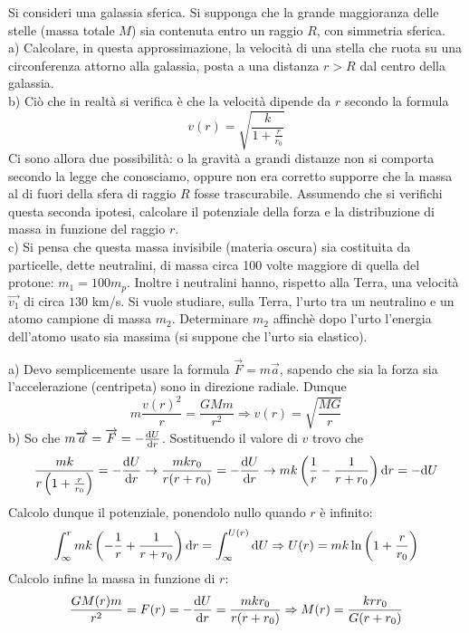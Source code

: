 \documentclass[../main.tex]{subfiles}
\begin{document}

\textex
Si consideri una galassia sferica. Si supponga che la grande maggioranza delle stelle (massa totale $M$) sia contenuta entro un raggio $R$, con simmetria sferica.\\
a) Calcolare, in questa approssimazione, la velocità di una stella che ruota su una circonferenza attorno alla galassia, posta a una distanza $r > R$ dal centro della galassia.\\
b) Ciò che in realtà si verifica è che la velocità dipende da $r$ secondo la formula
$$ v(r) = \sqrt{\frac{k}{1+\frac{r}{r_0}}}$$
Ci sono allora due possibilità: o la gravità a grandi distanze non si comporta secondo la legge che conosciamo, oppure non era corretto supporre che la massa al di fuori della sfera di raggio $R$ fosse trascurabile.
Assumendo che si verifichi questa seconda ipotesi, calcolare il potenziale della forza e la distribuzione di massa in funzione del raggio $r$.\\
c) Si pensa che questa massa invisibile (materia oscura) sia costituita da particelle, dette neutralini, di massa circa 100 volte maggiore di quella del protone: $m_1 = 100 m_p$.
Inoltre i neutralini hanno, rispetto alla Terra, una velocità $\overrightarrow{v_1}$ di circa $130$ km/s.
Si vuole studiare, sulla Terra, l'urto tra un neutralino e un atomo campione di massa $m_2$. Determinare $m_2$ affinchè dopo l'urto l'energia dell'atomo usato sia massima (si suppone che l'urto sia elastico).

\solution
a) Devo semplicemente usare la formula $\overrightarrow F = m\overrightarrow a$, sapendo che sia la forza sia l'accelerazione (centripeta) sono in direzione radiale. Dunque
\begin{equation}
 m\frac{v(r)^2}{r} = \frac{GMm}{r^2} \Rightarrow v(r) = \sqrt{\frac{MG}{r}}
\end{equation}
b) So che $m\overrightarrow a = \overrightarrow F = -\frac{\mathrm{d} U}{\mathrm{d} r}$. Sostituendo il valore di $v$ trovo che
\begin{equation}
  \frac{mk}{r\left ( 1+\frac{r}{r_0}\right )} = -\frac{\mathrm{d} U}{\mathrm{d} r} \rightarrow 
\frac{mkr_0}{r(r+r_0)} = -\frac{\mathrm{d} U}{\mathrm{d} r} \rightarrow mk\left ( \frac{1}{r} - \frac{1}{r+r_0}\right ) \mathrm{d} r = -\mathrm{d} U
\end{equation}
Calcolo dunque il potenziale, ponendolo nullo quando $r$ è infinito:
\begin{equation}
 \int_{\infty}^{r} mk\left ( -\frac{1}{r} + \frac{1}{r+r_0}\right ) \mathrm{d} r = \int_{\infty}^{U(r)} \mathrm{d} U \Rightarrow
 U(r) = mk \ln \left ( 1 + \frac{r}{r_0}\right )
\end{equation}
Calcolo infine la massa in funzione di $r$: 
\begin{equation}
 \frac{GM(r)m}{r^2} = F(r) = -\frac{\mathrm{d} U}{\mathrm{d} r} = \frac{mkr_0}{r(r+r_0)} \Rightarrow 
 M(r) = \frac{krr_0}{G(r+r_0)}
\end{equation}
\end{document}
